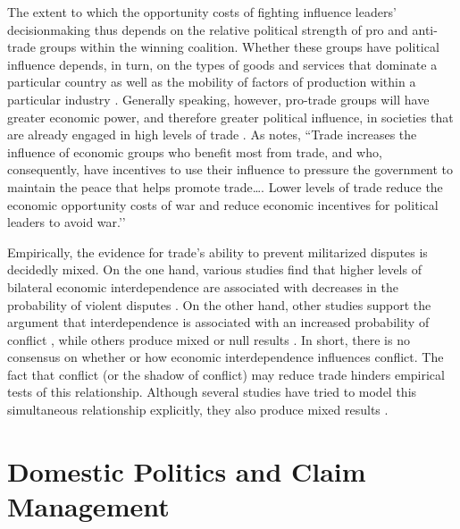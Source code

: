 \documentclass[../../dissertation.tex]{subfiles}
\begin{document}
The extent to which the opportunity costs of fighting influence leaders’ decisionmaking thus depends on the relative political strength of pro and anti-trade groups within the winning coalition. Whether these groups have political influence depends, in turn, on the types of goods and services that dominate a particular country as well as the mobility of factors of production within a particular industry \citep{hiscox2002}. Generally speaking, however,  pro-trade groups will have greater economic power, and therefore greater political influence, in societies that are already engaged in high levels of trade \citep{rogowski1989, solingen1989}. As \citet[][128]{levy2009} notes, ``Trade increases the influence of economic groups who benefit most from trade, and who, consequently, have incentives to use their influence to pressure the government to maintain the peace that helps promote trade…. Lower levels of trade reduce the economic opportunity costs of war and reduce economic incentives for political leaders to avoid war.’’

Empirically, the evidence for trade’s ability to prevent militarized disputes is decidedly mixed. On the one hand, various studies find that higher levels of bilateral economic interdependence are associated with decreases in the probability of violent disputes \citep[e.g.,][]{choi2011, gartzke2003, gartzke2007, russett2001, oneal2002}. On the other hand, other studies support the argument that interdependence is associated with an increased probability of conflict \citep[e.g.,][]{barbieri2002, crescenzi2003a}, while others produce mixed or null results \citep[e.g.,][]{choi2011, gartzke2001, gartzke2003, gartzke2007, green2001}. In short, there is no consensus on whether or how economic interdependence influences conflict. The fact that conflict (or the shadow of conflict) may reduce trade hinders empirical tests of this relationship. Although several studies have tried to model this simultaneous relationship explicitly, they also produce mixed results \citep{hegre2010, keshk2004, kim1998b, kim2005, mansfield1994, pollins1989a, pollins1989b, reuveny1996}.

\section{Domestic Politics and Claim Management}
\end{document}
